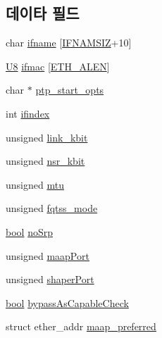 \subsection*{데이타 필드}
\begin{DoxyCompactItemize}
\item 
char \hyperlink{structopenavb__endpoint__cfg__t_a11d6071e5fa37b0c5776e17651485f11}{ifname} \mbox{[}\hyperlink{tl_2openavb__tl__pub_8h_acd06da230a96d3b7e6f193c5b3142002}{I\+F\+N\+A\+M\+S\+IZ}+10\mbox{]}
\item 
\hyperlink{openavb__types__base__pub_8h_aa63ef7b996d5487ce35a5a66601f3e73}{U8} \hyperlink{structopenavb__endpoint__cfg__t_adc83f17023461d176d86627c972fcf3e}{ifmac} \mbox{[}\hyperlink{avb__avtp_8h_a9822d89774e0d6ddaa06503950130423}{E\+T\+H\+\_\+\+A\+L\+EN}\mbox{]}
\item 
char $\ast$ \hyperlink{structopenavb__endpoint__cfg__t_aeb1ec327c597df953ede6b8d381cc672}{ptp\+\_\+start\+\_\+opts}
\item 
int \hyperlink{structopenavb__endpoint__cfg__t_a01e636f8746c84f1cf3d45c4afbfde35}{ifindex}
\item 
unsigned \hyperlink{structopenavb__endpoint__cfg__t_a27c44d17d0775a010acf648685444d5e}{link\+\_\+kbit}
\item 
unsigned \hyperlink{structopenavb__endpoint__cfg__t_a786d3fe3842764d5a022f0227542c759}{nsr\+\_\+kbit}
\item 
unsigned \hyperlink{structopenavb__endpoint__cfg__t_af9f36281e7abc3e1e6c467f8881cbfa2}{mtu}
\item 
unsigned \hyperlink{structopenavb__endpoint__cfg__t_a3a09404ec6009d8bebf0a96f01d77dde}{fqtss\+\_\+mode}
\item 
\hyperlink{avb__gptp_8h_af6a258d8f3ee5206d682d799316314b1}{bool} \hyperlink{structopenavb__endpoint__cfg__t_a7aa1ffc23600558afd81a0a6be1db5e6}{no\+Srp}
\item 
unsigned \hyperlink{structopenavb__endpoint__cfg__t_a5c3c54c1842b2ea86da2fb15728b5ab0}{maap\+Port}
\item 
unsigned \hyperlink{structopenavb__endpoint__cfg__t_af0b95a8fd7e3488230cbdd50df54d6ab}{shaper\+Port}
\item 
\hyperlink{avb__gptp_8h_af6a258d8f3ee5206d682d799316314b1}{bool} \hyperlink{structopenavb__endpoint__cfg__t_a95985194beeb1c1f3afe51922422b261}{bypass\+As\+Capable\+Check}
\item 
struct ether\+\_\+addr \hyperlink{structopenavb__endpoint__cfg__t_aa373a13c1441edd60e02fe528e88b2e7}{maap\+\_\+preferred}
\end{DoxyCompactItemize}


